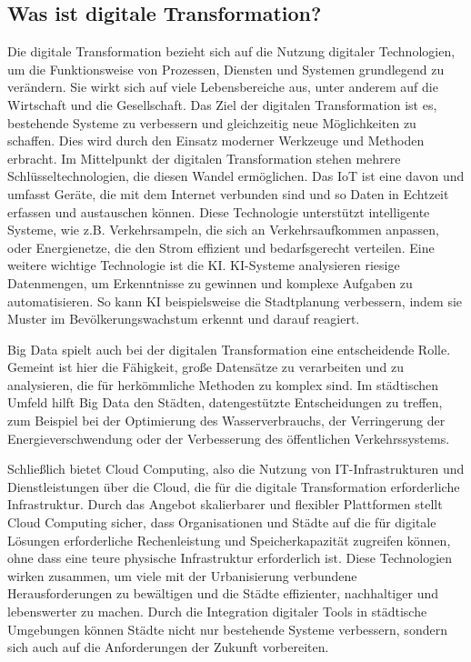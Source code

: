 \documentclass[conference,compsoc,final,a4paper, onecolumn, 11pt]{IEEEtran}
\begin{document}
\subsection{Was ist digitale Transformation?}
Die digitale Transformation bezieht sich auf die Nutzung digitaler Technologien, um die Funktionsweise von Prozessen, Diensten und Systemen grundlegend zu verändern. 
Sie wirkt sich auf viele Lebensbereiche aus, unter anderem auf die Wirtschaft und die Gesellschaft. 
Das Ziel der digitalen Transformation ist es, bestehende Systeme zu verbessern und gleichzeitig neue Möglichkeiten zu schaffen. 
Dies wird durch den Einsatz moderner Werkzeuge und Methoden erbracht. \autocite{agustian_impact_2023}
Im Mittelpunkt der digitalen Transformation stehen mehrere Schlüsseltechnologien, die diesen Wandel ermöglichen. 
Das \ac{IoT} ist eine davon und umfasst Geräte, die mit dem Internet verbunden sind und so Daten in Echtzeit erfassen und austauschen können. \autocite{noauthor_next_2024}
Diese Technologie unterstützt intelligente Systeme, wie z.B. Verkehrsampeln, die sich an Verkehrsaufkommen anpassen, oder Energienetze, die den Strom effizient und bedarfsgerecht verteilen.
Eine weitere wichtige Technologie ist die \ac{KI}. 
\ac{KI}-Systeme analysieren riesige Datenmengen, um Erkenntnisse zu gewinnen und komplexe Aufgaben zu automatisieren. 
So kann \ac{KI} beispielsweise die Stadtplanung verbessern, indem sie Muster im Bevölkerungswachstum erkennt und darauf reagiert. \autocite{sasidhar_parasa_artificial_2023}

Big Data spielt auch bei der digitalen Transformation eine entscheidende Rolle. 
Gemeint ist hier die Fähigkeit, große Datensätze zu verarbeiten und zu analysieren, die für herkömmliche Methoden zu komplex sind. 
Im städtischen Umfeld hilft Big Data den Städten, datengestützte Entscheidungen zu treffen, zum Beispiel bei der Optimierung des Wasserverbrauchs, der Verringerung der Energieverschwendung oder der Verbesserung des öffentlichen Verkehrssystems. \autocite{ma_role_2024}

Schließlich bietet Cloud Computing, also die Nutzung von IT-Infrastrukturen und Dienstleistungen über die Cloud, die für die digitale Transformation erforderliche Infrastruktur. 
Durch das Angebot skalierbarer und flexibler Plattformen stellt Cloud Computing sicher, dass Organisationen und Städte auf die für digitale Lösungen erforderliche Rechenleistung und Speicherkapazität zugreifen können, ohne dass eine teure physische Infrastruktur erforderlich ist. \autocite{saarikko_digital_2020} 
Diese Technologien wirken zusammen, um viele mit der Urbanisierung verbundene Herausforderungen zu bewältigen und die Städte effizienter, nachhaltiger und lebenswerter zu machen. 
Durch die Integration digitaler Tools in städtische Umgebungen können Städte nicht nur bestehende Systeme verbessern, sondern sich auch auf die Anforderungen der Zukunft vorbereiten.
\end{document}

